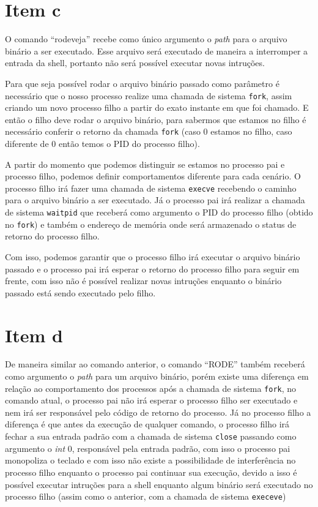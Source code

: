 \documentclass[12pt, twoside, a4paper]{article}
\begin{document}
\section{Item c}%
O comando ``rodeveja'' recebe como único argumento o \emph{path} para o arquivo binário a ser executado. Esse arquivo será executado de maneira a interromper a entrada da shell, portanto não será possível executar novas intruções.

Para que seja possível rodar o arquivo binário passado como parâmetro é necessário que o nosso processo realize uma chamada de sistema \verb|fork|, assim criando um novo processo filho a partir do exato instante em que foi chamado. E então o filho deve rodar o arquivo binário, para sabermos que estamos no filho é necessário conferir o retorno da chamada \verb|fork| (caso 0 estamos no filho, caso diferente de 0 então temos o PID do processo filho). 

A partir do momento que podemos distinguir se estamos no processo pai e processo filho, podemos definir comportamentos diferente para cada cenário. O processo filho irá fazer uma chamada de sistema \verb|execve| recebendo o caminho para o arquivo binário a ser executado. Já o processo pai irá realizar a chamada de sistema \verb|waitpid| que receberá como argumento o PID do processo filho (obtido no \verb|fork|) e também o endereço de memória onde será armazenado o status de retorno do processo filho.

Com isso, podemos garantir que o processo filho irá executar o arquivo binário passado e o processo pai irá esperar o retorno do processo filho para seguir em frente, com isso não é possível realizar novas intruções enquanto o binário passado está sendo executado pelo filho.

\section{Item d}%

De maneira similar ao comando anterior, o comando ``RODE'' também receberá como argumento o \emph{path} para um arquivo binário, porém existe uma diferença em relação ao comportamento dos processos após a chamada de sistema \verb|fork|, no comando atual, o processo pai não irá esperar o processo filho ser executado e nem irá ser responsável pelo código de retorno do processo. Já no processo filho a diferença é que antes da execução de qualquer comando, o processo filho irá fechar a sua entrada padrão com a chamada de sistema \verb|close| passando como argumento o \textit{int} 0, responsável pela entrada padrão, com isso o processo pai monopoliza o teclado e com isso não existe a possibilidade de interferência no processo filho enquanto o processo pai continuar sua execução, devido a isso é possível executar intruções para a shell enquanto algum binário será executado no processo filho (assim como o anterior, com a chamada de sistema \verb|execeve|)
\end{document}
